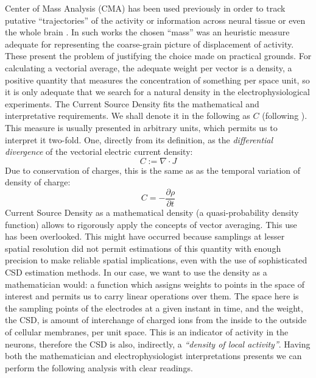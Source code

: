 \documentclass[12pt, letterpaper]{article}
\begin{document}
Center of Mass Analysis (CMA) has been used previously in order to track putative  ``trajectories'' of the activity or information across neural tissue or even the whole brain \cite{Chao05, Chao07, Manjarrez07, Manjarrez09}. In such works the chosen ``mass'' was an heuristic measure adequate for representing the coarse-grain picture of displacement of activity. These present the problem of justifying the choice made on practical grounds. For calculating a vectorial average, the adequate weight per vector is a density, a positive quantity that measures the concentration of something per space unit, so it is only adequate that we search for a natural density in the electrophysiological experiments. The Current Source Density fits the mathematical and interpretative requirements. We shall denote it in the following as $C$ (following \cite{Potworowski2011}).  This measure is usually presented in arbitrary units, which permits us to interpret it two-fold. One, directly from its definition, as the \emph{differential divergence} of the vectorial electric current density:
\begin{equation}
  C:=\nabla \cdot J
\end{equation}
Due to conservation of charges, this is the same as as the temporal variation of density of charge:
\begin{equation}
  C=-\frac{\partial \rho}{\partial t}
\end{equation}
Current Source Density as a mathematical density (a quasi-probability density function)  allows  to rigorously apply the concepts of vector averaging. This use has been overlooked. This might have occurred because  samplings at lesser spatial resolution did not permit estimations of this quantity with enough precision to make reliable spatial implications, even with the use of sophisticated CSD estimation methods. In our case, we want to use the density as a mathematician would: a function which assigns weights to points in the space of interest and permits us to carry linear operations over them.  The space here is the sampling points of the electrodes at a given instant in time, and the weight, the CSD, is amount of interchange of charged ions from the inside to the outside of cellular membranes, per unit space.  This is an indicator of activity in the neurons, therefore the CSD is also, indirectly, a \emph{``density of local activity''}. Having both
the mathematician and electrophysiologist interpretations presents we can
perform the following analysis with clear readings. 
\end{document}
